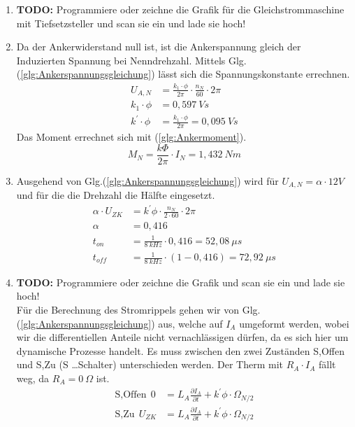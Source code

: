 \begin{solution}
\begin{enumerate}
	\item \textbf{TODO:} Programmiere oder zeichne die Grafik für die Gleichstrommaschine mit Tiefsetzsteller und scan sie ein und lade sie hoch!
\item Da der Ankerwiderstand null ist, ist die Ankerspannung gleich der Induzierten Spannung bei Nenndrehzahl. Mittels Glg.(\ref{glg:Ankerspannungsgleichung}) lässt sich die Spannungskonstante errechnen.
\begin{align}
U_{A,N} &= \frac{k_1 \cdot \phi}{2 \pi} \cdot \frac{n_N}{60} \cdot 2 \pi\\
k_1 \cdot \phi &= 0,597~Vs\\
k^{'} \cdot \phi &= \frac{k_1 \cdot \phi}{2 \pi} = 0,095~Vs
\end{align}
Das Moment errechnet sich mit (\ref{glg:Ankermoment}).\\
\begin{equation}
M_N=\frac{k \Phi}{2 \pi} \cdot I_N =1,432~Nm
\end{equation}
\item Ausgehend von Glg.(\ref{glg:Ankerspannungsgleichung}) wird für $U_{A,N} = \alpha \cdot 12V$ und für die die Drehzahl die Hälfte eingesetzt.
\begin{align}
\alpha \cdot U_{ZK} &= k^{'} \phi \cdot \frac{n_N}{2 \cdot 60} \cdot 2 \pi \\
\alpha &= 0,416\\
t_{on} &= \frac{1}{8~kHz} \cdot 0,416 = 52,08~\mu s\\
t_{off} &= \frac{1}{8~kHz} \cdot(1- 0,416) = 72,92~\mu s
\end{align}
\item \textbf{TODO:} Programmiere oder zeichne die Grafik und scan sie ein und lade sie hoch!\\
Für die Berechnung des Stromrippels gehen wir von Glg.(\ref{glg:Ankerspannungsgleichung}) aus, welche auf $I_A$ umgeformt werden, wobei wir die differentiellen Anteile nicht vernachlässigen dürfen, da es sich hier um dynamische Prozesse handelt. Es muss zwischen den zwei Zuständen S,Offen und S,Zu (S \dots Schalter) unterschieden werden. Der Therm mit $R_A \cdot I_A$ fällt weg, da $R_A= 0~\Omega$ ist.
\begin{align}
\text{S,Offen}~~ 0 &= L_A \frac{\partial I_A}{\partial t} + k^{'} \phi \cdot \Omega_{N/2}\\
\text{S,Zu}~~ U_{ZK} &= L_A \frac{\partial I_A}{\partial t} + k^{'} \phi \cdot \Omega_{N/2}\\

\end{align}
\end{enumerate}
\end{solution}
